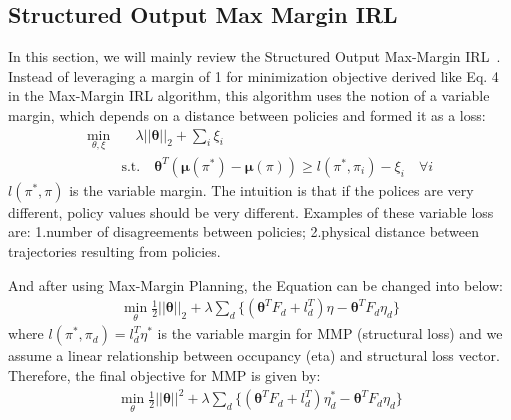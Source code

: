 \documentclass[11pt]{article}
\begin{document}
\subsection{Structured Output Max Margin IRL}

In this section, we will mainly review the Structured Output Max-Margin IRL~\cite{ratliff2006maximum}. 
%
Instead of leveraging a margin of 1 for minimization objective derived like Eq. 4 in the Max-Margin IRL algorithm, this algorithm uses the notion of a variable margin, which depends on a distance between policies and formed it as a loss:
\begin{equation}
    \label{eq:min_obj_mmp}
    \begin{split}
        \min\limits_{\theta, \xi} & \quad\lambda ||\boldsymbol\theta||_2 + \sum\limits_i \xi_i \\
        & \textrm{s.t.} \quad \boldsymbol{\theta}^T(\boldsymbol{\mu}(\pi^\ast) - \boldsymbol{\mu}(\pi)) \geq l(\pi^\ast, \pi_i) - \xi_i \quad \forall i
    \end{split}
\end{equation}
$l(\pi^\ast, \pi)$ is the variable margin. The intuition is that if the polices are very different, policy values should be very different. Examples of these variable loss are: 1.number of disagreements between policies; 2.physical distance between trajectories resulting from policies.

And after using Max-Margin Planning, the Equation can be changed into below:
\begin{equation}
    \label{eq:min_obj_mmp}
    \begin{split}
        \min\limits_{\theta} \frac{1}{2}||\boldsymbol{\theta}||_2 
        + \lambda \sum\limits_d\big\{ (\boldsymbol{\theta}^TF_d + l_d^T)\eta  - 
        \boldsymbol{\theta}^T F_d \eta_d \big\}
    \end{split}
\end{equation}
where $l(\pi^\ast, \pi_d) = l_d^T \eta^\ast$ is the variable margin for MMP
(structural loss) and we assume a linear relationship between 
occupancy (eta) and structural loss vector.
%
Therefore, the final objective for MMP is given by:
\begin{equation}
    \label{eq:final_min_obj_mmp}
    \begin{split}
        \min\limits_{\theta} \frac{1}{2}||\boldsymbol{\theta}||^2
        + \lambda \sum\limits_d  \big\{ (\boldsymbol{\theta}^TF_d + l_d^T)\eta_d^*  - 
        \boldsymbol{\theta}^T F_d \eta_d \big\}
    \end{split}
\end{equation}
\end{document}
